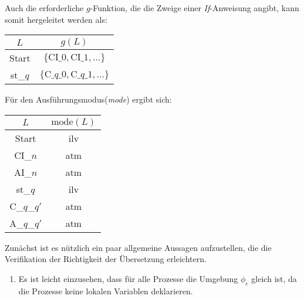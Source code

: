Auch die erforderliche $g$-Funktion, die die Zweige einer \emph{If}-Anweisung angibt, kann somit hergeleitet werden als:

\begin{tabular}{|c|c|}
  \hline
  $L$ & $g(L)$\\
  \hline
  Start & $\{ \textrm{CI_}0,\textrm{CI_}1,\dots \}$\\
  st_$q$ & $\{ \textrm{C_}q\textrm{_}0,\textrm{C_}q\textrm{_}1,\dots \}$\\
  \hline
\end{tabular}

Für den Ausführungsmodus(\emph{mode}) ergibt sich:

\begin{tabular}{|c|c|}
  \hline
  $L$ & $\textrm{mode}(L)$\\
  \hline
  Start & ilv\\
  CI_$n$ & atm\\
  AI_$n$ & atm\\
  st_$q$ & ilv\\
  C_$q$_$q'$ & atm\\
  A_$q$_$q'$ & atm\\
  \hline
\end{tabular}

Zunächst ist es nützlich ein paar allgemeine Aussagen aufzustellen, die die Verifikation der Richtigkeit der Übersetzung erleichtern.
\begin{enumerate}
\item Es ist leicht einzusehen, dass für alle Prozesse die Umgebung $\phi_e$ gleich ist, da die Prozesse keine lokalen Variablen deklarieren.
\end{enumerate}

